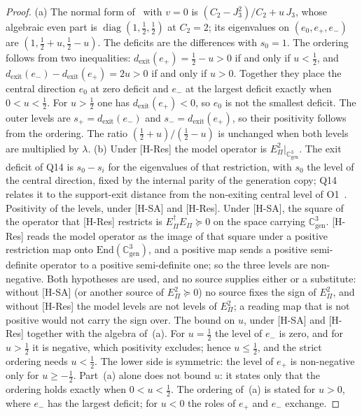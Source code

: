 \documentclass[11pt]{article}
\theoremstyle{definition}
\theoremstyle{remark}
\newcommand{\Jthree}{J_{3}}
\newcommand{\Cgen}{\mathbb{C}^{3}_{\mathrm{gen}}}
\newcommand{\Epi}{E_{\Pi}}
\newcommand{\diag}{\operatorname{diag}}
\begin{document}
    \begin{proof}
      (a) The normal form of~\cite{Beau2026prs} with $v = 0$ is $(C_{2} - \Jthree^{2})/C_{2} + u\,\Jthree$, whose
      algebraic even part is $\diag(1, \tfrac12, \tfrac12)$ at $C_{2} = 2$; its eigenvalues on
      $(e_{0}, e_{+}, e_{-})$ are $(1, \tfrac12 + u, \tfrac12 - u)$.
      The deficits are the differences with $s_{0} = 1$.
      The ordering follows from two inequalities: $d_{\mathrm{exit}}(e_{+}) = \tfrac12 - u > 0$ if and only if
      $u < \tfrac12$, and $d_{\mathrm{exit}}(e_{-}) - d_{\mathrm{exit}}(e_{+}) = 2u > 0$ if and only if $u > 0$.
      Together they place the central direction $e_{0}$ at zero deficit and $e_{-}$ at the largest deficit exactly when
      $0 < u < \tfrac12$.
      For $u > \tfrac12$ one has $d_{\mathrm{exit}}(e_{+}) < 0$, so $e_{0}$ is not the smallest deficit.
      The outer levels are $s_{+} = d_{\mathrm{exit}}(e_{-})$ and $s_{-} = d_{\mathrm{exit}}(e_{+})$, so their
      positivity follows from the ordering.
      The ratio $(\tfrac12 + u)/(\tfrac12 - u)$ is unchanged when both levels are multiplied by $\lambda$.
      (b) Under [H-Res] the model operator is $\Epi^{2}|_{\Cgen}$.
      The exit deficit of Q14 is $s_{0} - s_{i}$ for the eigenvalues of that restriction, with $s_{0}$ the level of the
      central direction, fixed by the internal parity of the generation copy; Q14 relates it to the support-exit
      distance from the non-exiting central level of O1~\cite{Beau2026a6}.
      Positivity of the levels, under [H-SA] and [H-Res].
      Under [H-SA], the square of the operator that [H-Res] restricts is $\Epi^{\dagger}\Epi \succeq 0$ on the space
      carrying $\Cgen$.
      [H-Res] reads the model operator as the image of that square under a positive restriction map onto
      $\mathrm{End}(\Cgen)$, and a positive map sends a positive semi-definite operator to a positive semi-definite
      one; so the three levels are non-negative.
      Both hypotheses are used, and no source supplies either or a substitute: without [H-SA] (or another source of
      $\Epi^{2} \succeq 0$) no source fixes the sign of $\Epi^{2}$, and without [H-Res] the model levels are not
      levels of $\Epi^{2}$; a reading map that is not positive would not carry the sign over.
      The bound on $u$, under [H-SA] and [H-Res] together with the algebra of~(a).
      For $u = \tfrac12$ the level of $e_{-}$ is zero, and for $u > \tfrac12$ it is negative, which positivity excludes;
      hence $u \leq \tfrac12$, and the strict ordering needs $u < \tfrac12$.
      The lower side is symmetric: the level of $e_{+}$ is non-negative only for $u \geq -\tfrac12$.
      Part~(a) alone does not bound $u$: it states only that the ordering holds exactly when $0 < u < \tfrac12$.
      The ordering of~(a) is stated for $u > 0$, where $e_{-}$ has the largest deficit; for $u < 0$ the roles of $e_{+}$
      and $e_{-}$ exchange.
    \end{proof}
\end{document}
